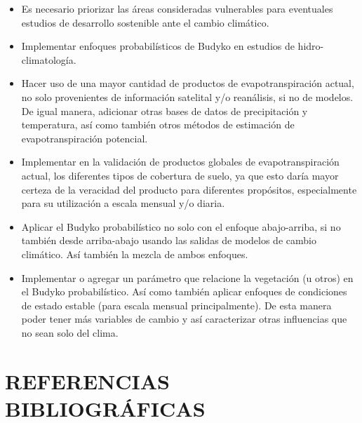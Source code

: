 \documentclass[12pt]{article}
\begin{document}
\begin{itemize}

    \item Es necesario priorizar las áreas consideradas vulnerables para eventuales estudios de desarrollo sostenible ante el cambio climático.

    \item Implementar enfoques probabilísticos de Budyko en estudios de hidro-climatología.
    
    \item Hacer uso de una mayor cantidad de productos de evapotranspiración actual, no solo provenientes de información satelital y/o reanálisis, si no de modelos. De igual manera, adicionar otras bases de datos de precipitación y temperatura, así como también otros métodos de estimación de evapotranspiración potencial.
    
    \item Implementar en la validación de productos globales de evapotranspiración actual, los diferentes tipos de cobertura de suelo, ya que esto daría mayor certeza de la veracidad del producto para diferentes propósitos, especialmente para su utilización a escala mensual y/o diaria.
    
    \item Aplicar el Budyko probabilístico no solo con el enfoque abajo-arriba, si no también desde arriba-abajo usando las salidas de modelos de cambio climático. Así también la mezcla de ambos enfoques.

    \item Implementar o agregar un parámetro que relacione la vegetación (u otros) en el Budyko probabilístico. Así como también aplicar enfoques de condiciones de estado estable (para escala mensual principalmente). De esta manera poder tener más variables de cambio y así caracterizar otras influencias que no sean solo del clima.
    
\end{itemize}


\clearpage
\vspace*{0.5mm}
\section{REFERENCIAS BIBLIOGRÁFICAS}

\thispagestyle{empty}





\clearpage
\vspace*{0.5mm}
\end{document}
